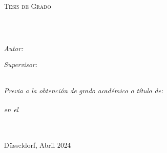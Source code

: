 \documentclass[
  letterpaper,
  11pt,
  spanish,
  singlespacing,
  headsepline]{MastersDoctoralThesis}
\author{Nombre del
autor} %
\begin{document}
\frontmatter %

\pagestyle{plain} %


\begin{titlepage}
\begin{center}

\vspace*{.06\textheight}
{\scshape\LARGE \univname\par}\vspace{1.5cm} %
\textsc{\Large Tesis de Grado}\\[0.5cm] %

\HRule \\[0.4cm] %
{\huge \bfseries \ttitle\par}\vspace{0.4cm} %
\HRule \\[1.5cm] %
 
\begin{minipage}[t]{0.4\textwidth}
\begin{flushleft} \large
\emph{Autor:}\\
\authorname
\end{flushleft}
\end{minipage}
\begin{minipage}[t]{0.4\textwidth}
\begin{flushright} \large
\emph{Supervisor:} \\
%
\supname

\end{flushright}
\end{minipage}\\[2cm]
 

\large \textit{Previa a la obtención de grado académico o título de:\\ \degreename}\\[0.3cm] %
\textit{en el}\\[0.4cm]
\groupname\\
\deptname\\[2cm] %
 
\vfill


{\large Düsseldorf, Abril 2024}\\[4cm] %

 
\vfill
\end{center}
\end{titlepage}
\end{document}
